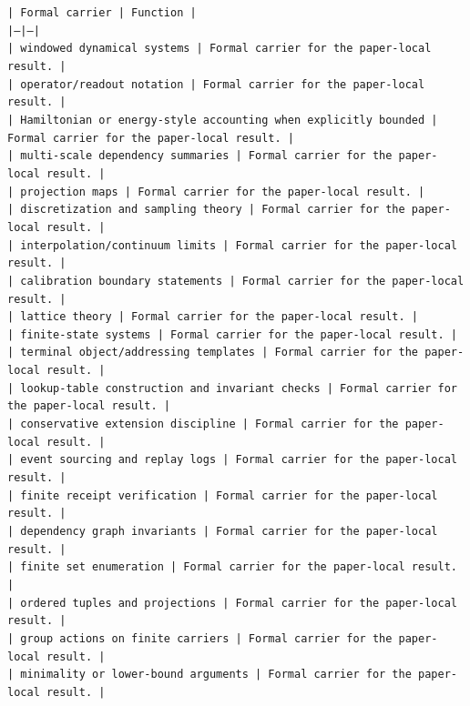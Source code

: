 \documentclass[11pt]{article}
\begin{document}
\noindent\texttt{| Formal carrier | Function |}\\
\noindent\texttt{|---|---|}\\
\noindent\texttt{| windowed dynamical systems | Formal carrier for the paper-local result. |}\\
\noindent\texttt{| operator/readout notation | Formal carrier for the paper-local result. |}\\
\noindent\texttt{| Hamiltonian or energy-style accounting when explicitly bounded | Formal carrier for the paper-local result. |}\\
\noindent\texttt{| multi-scale dependency summaries | Formal carrier for the paper-local result. |}\\
\noindent\texttt{| projection maps | Formal carrier for the paper-local result. |}\\
\noindent\texttt{| discretization and sampling theory | Formal carrier for the paper-local result. |}\\
\noindent\texttt{| interpolation/continuum limits | Formal carrier for the paper-local result. |}\\
\noindent\texttt{| calibration boundary statements | Formal carrier for the paper-local result. |}\\
\noindent\texttt{| lattice theory | Formal carrier for the paper-local result. |}\\
\noindent\texttt{| finite-state systems | Formal carrier for the paper-local result. |}\\
\noindent\texttt{| terminal object/addressing templates | Formal carrier for the paper-local result. |}\\
\noindent\texttt{| lookup-table construction and invariant checks | Formal carrier for the paper-local result. |}\\
\noindent\texttt{| conservative extension discipline | Formal carrier for the paper-local result. |}\\
\noindent\texttt{| event sourcing and replay logs | Formal carrier for the paper-local result. |}\\
\noindent\texttt{| finite receipt verification | Formal carrier for the paper-local result. |}\\
\noindent\texttt{| dependency graph invariants | Formal carrier for the paper-local result. |}\\
\noindent\texttt{| finite set enumeration | Formal carrier for the paper-local result. |}\\
\noindent\texttt{| ordered tuples and projections | Formal carrier for the paper-local result. |}\\
\noindent\texttt{| group actions on finite carriers | Formal carrier for the paper-local result. |}\\
\noindent\texttt{| minimality or lower-bound arguments | Formal carrier for the paper-local result. |}\\
\end{document}
